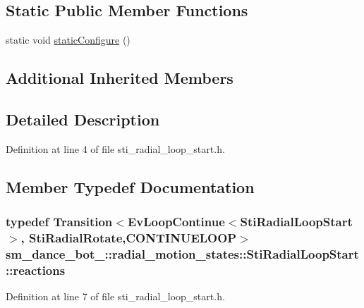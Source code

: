 \subsection*{Static Public Member Functions}
\begin{DoxyCompactItemize}
\item 
static void \hyperlink{structsm__dance__bot__2_1_1radial__motion__states_1_1StiRadialLoopStart_a2a0ecf3b3b67d616a79924a229d7933d}{static\+Configure} ()
\end{DoxyCompactItemize}
\subsection*{Additional Inherited Members}


\subsection{Detailed Description}


Definition at line 4 of file sti\+\_\+radial\+\_\+loop\+\_\+start.\+h.



\subsection{Member Typedef Documentation}
\subsubsection[{\texorpdfstring{reactions}{reactions}}]{\setlength{\rightskip}{0pt plus 5cm}typedef Transition$<$Ev\+Loop\+Continue$<${\bf Sti\+Radial\+Loop\+Start}$>$, {\bf Sti\+Radial\+Rotate},C\+O\+N\+T\+I\+N\+U\+E\+L\+O\+OP$>$ {\bf sm\+\_\+dance\+\_\+bot\+\_\+::radial\+\_\+motion\+\_\+states\+::\+Sti\+Radial\+Loop\+Start\+::reactions}}\hypertarget{structsm__dance__bot__2_1_1radial__motion__states_1_1StiRadialLoopStart_a27957a8a39ae0f4507d93e41e6af1efc}{}\label{structsm__dance__bot__2_1_1radial__motion__states_1_1StiRadialLoopStart_a27957a8a39ae0f4507d93e41e6af1efc}


Definition at line 7 of file sti\+\_\+radial\+\_\+loop\+\_\+start.\+h.



